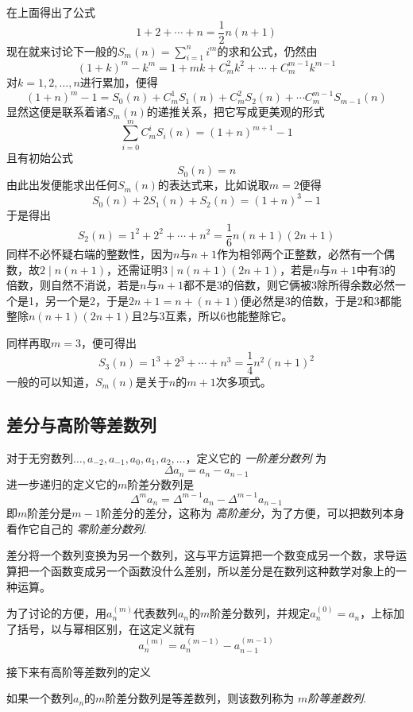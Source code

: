 \begin{example}[自然数的幂和]
  \label{example:sum-of-power-of-integer}
  在上面得出了公式
  \[ 1+2+\cdots+n = \frac{1}{2}n(n+1) \]
  现在就来讨论下一般的$S_m(n)=\sum_{i=1}^ni^m$的求和公式，仍然由
  \[ (1+k)^m-k^m = 1 + mk + C_m^2k^2 + \cdots + C_m^{m-1}k^{m-1} \]
  对$k=1,2,\ldots,n$进行累加，便得
  \[ (1+n)^m-1 = S_0(n)+C_m^1S_1(n)+C_m^2S_2(n) + \cdots C_m^{m-1}S_{m-1}(n) \]
  显然这便是联系着诸$S_m(n)$的递推关系，把它写成更美观的形式
  \[ \sum_{i=0}^mC_m^iS_i(n) = (1+n)^{m+1}-1 \]
  且有初始公式
  \[ S_0(n) = n \]
  由此出发便能求出任何$S_m(n)$的表达式来，比如说取$m=2$便得
  \[ S_0(n)+2S_1(n)+S_2(n) = (1+n)^3-1 \]
  于是得出
  \[ S_2(n) = 1^2+2^2+\cdots+n^2 = \frac{1}{6}n(n+1)(2n+1) \]
  同样不必怀疑右端的整数性，因为$n$与$n+1$作为相邻两个正整数，必然有一个偶数，故$2 \mid n(n+1)$，还需证明$3 \mid n(n+1)(2n+1)$，若是$n$与$n+1$中有3的倍数，则自然不消说，若是$n$与$n+1$都不是3的倍数，则它俩被3除所得余数必然一个是1，另一个是2，于是$2n+1=n+(n+1)$便必然是3的倍数，于是2和3都能整除$n(n+1)(2n+1)$且2与3互素，所以6也能整除它。

  同样再取$m=3$，便可得出
  \[ S_3(n)= 1^3+2^3+\cdots+n^3 = \frac{1}{4}n^2(n+1)^2 \]
  一般的可以知道，$S_m(n)$是关于$n$的$m+1$次多项式。
\end{example}

\subsection{差分与高阶等差数列}
\label{sec:difference-and-high-level-common-difference-sequence}

\begin{definition}
  对于无穷数列$\ldots,a_{-2},a_{-1},a_0,a_1,a_2,\ldots$，定义它的 \emph{一阶差分数列} 为
  \[ \Delta a_n = a_n-a_{n-1} \]
  进一步递归的定义它的$m$阶差分数列是
  \[ \Delta^ma_n = \Delta^{m-1}a_n - \Delta^{m-1}a_{n-1} \]
  即$m$阶差分是$m-1$阶差分的差分，这称为 \emph{高阶差分}，为了方便，可以把数列本身看作它自己的 \emph{零阶差分数列}.
\end{definition}

差分将一个数列变换为另一个数列，这与平方运算把一个数变成另一个数，求导运算把一个函数变成另一个函数没什么差别，所以差分是在数列这种数学对象上的一种运算。

为了讨论的方便，用$a_n^{(m)}$代表数列$a_n$的$m$阶差分数列，并规定$a_n^{(0)}=a_n$，上标加了括号，以与幂相区别，在这定义就有
\[ a_n^{(m)} = a_n^{(m-1)} - a_{n-1}^{(m-1)} \]

接下来有高阶等差数列的定义
\begin{definition}
  如果一个数列$a_n$的$m$阶差分数列是等差数列，则该数列称为 \emph{$m$阶等差数列}.
\end{definition}

